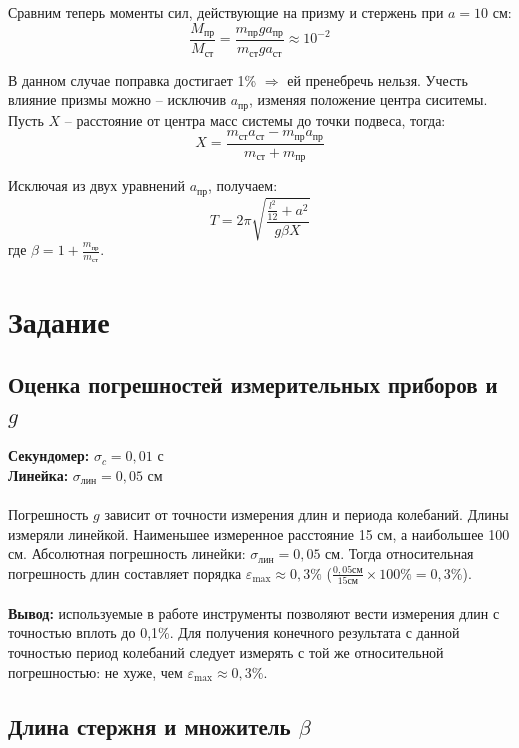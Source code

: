 	Сравним теперь моменты сил, действующие на призму и стержень при $a = 10$ см:
	\begin{equation}
		\frac{M_\text{пр}}{M_\text{ст}} = \frac{m_\text{пр}ga_\text{пр}}{m_\text{ст}ga_\text{ст}} \approx 10^{-2}
	\end{equation}
	
	В данном случае поправка достигает 1\% $\Rightarrow$ ей пренебречь нельзя. Учесть влияние призмы можно -- исключив $a_\text{пр}$, изменяя положение центра сиситемы. Пусть $X$ -- расстояние от центра масс системы до точки подвеса, тогда:
	\begin{equation}
		X=\frac{m_\text{ст}a_\text{ст}-m_\text{пр}a_\text{пр}}{m_\text{ст} + m_\text{пр}}
	\end{equation}
	
	
	Исключая из двух уравнений $a_\text{пр}$, получаем:
	\begin{equation}\label{period}
		T = 2\pi \sqrt{\frac{\frac{l^2}{12}+a^2}{g\beta X}}
	\end{equation}	
	\noindent где $\beta= 1+\frac{m_\text{пр}}{m_\text{ст}}$.
	\section{Задание}
	\subsection{Оценка погрешностей измерительных приборов и $g$}
	\textbf{Секундомер:} $ \sigma_c = 0,01 \text{ с}$\\
	\textbf{Линейка:} $ \sigma_\text{лин} = 0,05 \text{ см}$\\\\
	Погрешность $g$ зависит от точности измерения длин и периода колебаний. Длины измеряли линейкой. Наименьшее измеренное расстояние 15 см, а наибольшее 100 см. Абсолютная погрешность линейки: $\sigma_\text{лин} = 0,05 \text{ см}$. Тогда относительная погрешность длин составляет порядка $\varepsilon_\text{max}\approx0,3\%$  ($\frac{0,05см}{15см}\times100\% = 0,3\%$).\\\\
	\textbf{Вывод:} используемые в работе инструменты позволяют вести измерения длин с точностью вплоть до 0,1\%. Для получения конечного результата с данной точностью период колебаний следует измерять с той же относительной погрешностью: не хуже, чем $\varepsilon_\text{max}\approx0,3\%$.
	\subsection{Длина стержня и множитель $\beta$}
	

